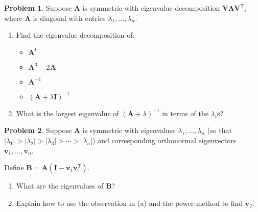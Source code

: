\documentclass[12pt]{article}
\theoremstyle{definition}
\newtheorem{problem}{Problem}
\renewcommand{\vec}{\mathbf}
\newcommand{\T}{\mathsf{T}}
\begin{document}
\begin{problem}
Suppose $\vec{A}$ is symmetric with eigenvalue decomposition $\vec{V}\vec{\Lambda}\vec{V}^\T$, where $\vec{\Lambda}$ is diagonal with entries $\lambda_1, \ldots, \lambda_n$.

\begin{enumerate}
    \item 
Find the eigenvalue decomposition of:
\begin{itemize}
\item $\vec{A}^k$    
\item $\vec{A}^3 -2 \vec{A}$
\item $\vec{A}^{-1}$
\item $(\vec{A}+\lambda \vec{I})^{-1}$
\end{itemize}
\item What is the largest eigenvalue of $(\vec{A}+\lambda)^{-1}$ in terms of the $\lambda_i$s?
\end{enumerate}
\end{problem}


\begin{problem}
    Suppose $\vec{A}$ is symmetric with eigenvalues $\lambda_1, \ldots, \lambda_n$ (so that $|\lambda_1| > |\lambda_2| > |\lambda_3| > \cdots > |\lambda_n|$) and corresponding orthonormal eigenvectors $\vec{v}_1, \ldots, \vec{v}_n$.

    Define $\vec{B} = \vec{A}(\vec{I} - \vec{v}_1\vec{v}_1^\T)$. 

    \begin{enumerate}
        \item What are the eigenvalues of $\vec{B}$?

        \item Explain how to use the observation in (a) and the power-method to find $\vec{v}_2$.

    \end{enumerate}

\end{problem}
\end{document}

